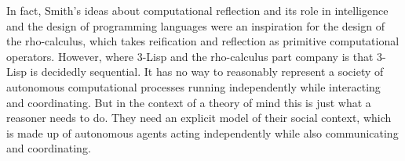 \vspace{1\baselineskip}
In fact, Smith’s ideas about computational reflection and its role in intelligence and the design of programming languages were an inspiration for the design of the rho-calculus, which takes reification and reflection as primitive computational operators. However, where 3-Lisp and the rho-calculus part company is that 3-Lisp is decidedly sequential. It has no way to reasonably represent a society of autonomous computational processes running independently while interacting and coordinating. But in the context of a theory of mind this is just what a reasoner needs to do. They need an explicit model of their social context, which is made up of autonomous agents acting independently while also communicating and coordinating.
